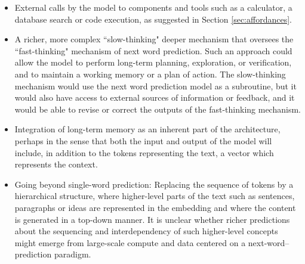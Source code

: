 \begin{itemize}
    \item External calls by the model to components and tools such as a calculator, a database search or code execution, as suggested in Section \ref{sec:affordances}. 
    \item A richer, more complex ``slow-thinking" deeper mechanism that oversees the ``fast-thinking" mechanism of next word prediction. Such an approach could allow the model to perform long-term planning, exploration, or verification, and to maintain a working memory or a plan of action. The slow-thinking mechanism would use the next word prediction model as a subroutine, but it would also have access to external sources of information or feedback, and it would be able to revise or correct the outputs of the fast-thinking mechanism.
    \item Integration of long-term memory as an inherent part of the architecture, perhaps in the sense that both the input and output of the model will include, in addition to the tokens representing the text, a vector which represents the context.
    \item Going beyond single-word prediction: Replacing the sequence of tokens by a hierarchical structure, where higher-level parts of the text such as sentences, paragraphs or ideas are represented in the embedding and where the content is generated in a top-down manner. It is unclear whether richer predictions about the sequencing and interdependency of such higher-level concepts might emerge from large-scale compute and data centered on a next-word--prediction paradigm.
\end{itemize}


